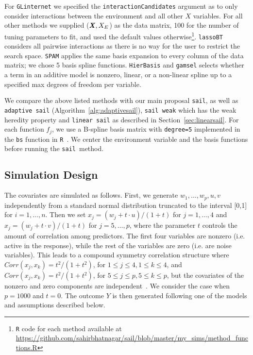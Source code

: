 \documentclass[12pt,letter]{article}\usepackage[]{graphicx}\usepackage[]{color}
\newcommand{\sail}{\texttt{sail}}
\newcommand{\bX}{\textbf{\emph{X}}}
\begin{document}
For \texttt{GLinternet} we specified the \texttt{interactionCandidates} argument as to only consider interactions between the environment and all other $X$ variables. For all other methods we supplied ($\bX, X_E$) as the data matrix, 100 for the number of tuning parameters to fit, and used the default values otherwise\footnote[1]{\texttt{R} code for each method available at \url{https://github.com/sahirbhatnagar/sail/blob/master/my_sims/method_functions.R}}. \texttt{lassoBT} considers all pairwise interactions as there is no way for the user to restrict the search space. \texttt{SPAM} applies the same basis expansion to every column of the data matrix; we chose 5 basis spline functions. \texttt{HierBasis} and \texttt{gamsel} selects whether a term in an additive model is nonzero, linear, or a non-linear spline up to a specified max degrees of freedom per variable. 

We compare the above listed methods with our main proposal \texttt{sail}, as well as \texttt{adaptive sail} (Algorithm~\ref{alg:adaptivesail}), \texttt{sail weak} which has the weak heredity property and \texttt{linear sail} as described in Section~\ref{sec:linearsail}. For each function $f_j$, we use a B-spline basis matrix with \texttt{degree=5} implemented in the \texttt{bs} function in \texttt{R}~\citep{cran}. We center the environment variable and the basis functions before running the \sail ~method.


\subsection{Simulation Design}
The covariates are simulated as follows. First, we generate $w_1,\ldots, w_p, u,v$ independently from a standard normal distribution truncated to the interval [0,1] for $i=1,\ldots,n$. Then we set $x_j = (w_j + t\cdot u)/(1 + t)$ for $j = 1,\ldots, 4$ and $x_j = (w_j + t\cdot v)/(1 + t)$ for $j = 5,\ldots, p$, where the parameter $t$ controls the amount of correlation among predictors. The first four variables are nonzero (i.e. active in the response), while the rest of the variables are zero (i.e. are noise variables). This leads to a compound symmetry correlation structure where $Corr(x_j,x_k) = t^2/(1+t^2)$, for $1 \leq j \leq 4, 1 \leq k \leq 4$, and $Corr(x_j,x_k) = t^2/(1+t^2)$, for $5 \leq j \leq p, 5 \leq k \leq p$, but the covariates of the nonzero and zero components are independent~\citep{lin2006component,huang2010variable}. We consider the case when $p=1000$ and $t=0$. The outcome $Y$ is then generated following one of the models and assumptions described below.
\end{document}
